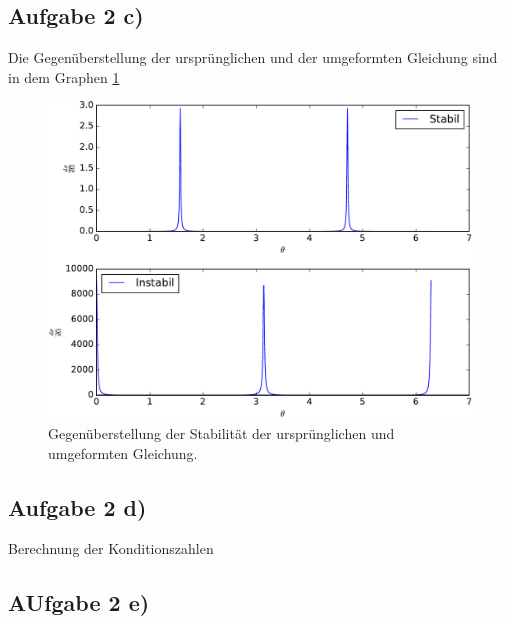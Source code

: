 \subsection{Aufgabe 2 c)}
Die Gegenüberstellung der ursprünglichen und der umgeformten Gleichung sind in dem Graphen \ref{fig:gegenstellung}
\begin{figure}[H]
  \centering
  \includegraphics[width=\textwidth]{plots/Stabiplot.pdf}
  \caption{Gegenüberstellung der Stabilität der ursprünglichen und umgeformten Gleichung.}
  \label{fig:gegenstellung}
\end{figure}
\subsection{Aufgabe 2 d)}
Berechnung der Konditionszahlen
\subsection{AUfgabe 2 e)}
